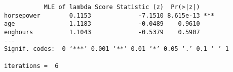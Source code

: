 \begin{verbatim}           MLE of lambda Score Statistic (z)  Pr(>|z|)    
horsepower        0.1153             -7.1510 8.615e-13 ***
age               1.1183             -0.0489    0.9610    
enghours          1.1043             -0.5379    0.5907    
---
Signif. codes:  0 ‘***’ 0.001 ‘**’ 0.01 ‘*’ 0.05 ‘.’ 0.1 ‘ ’ 1

iterations =  6 
\end{verbatim}